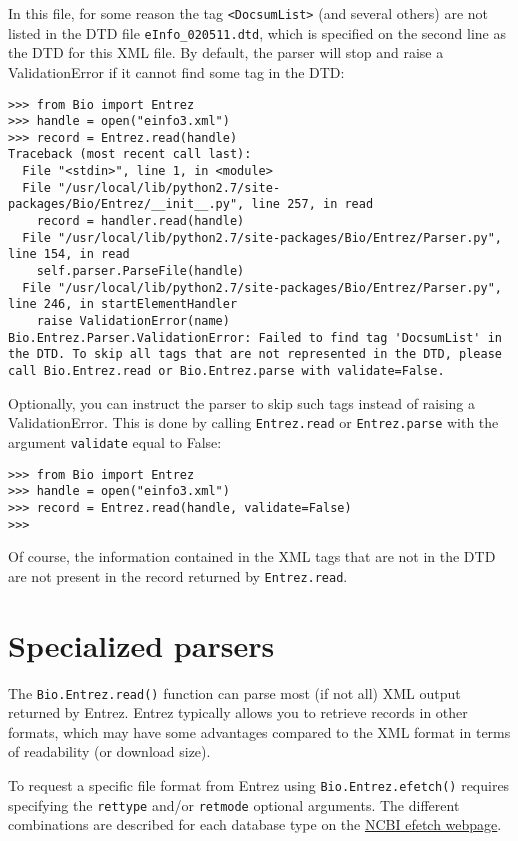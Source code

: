 \documentclass{report}
\begin{document}
In this file, for some reason the tag \verb|<DocsumList>| (and several others) are not listed in the DTD file \verb|eInfo_020511.dtd|, which is specified on the second line as the DTD for this XML file. By default, the parser will stop and raise a ValidationError if it cannot find some tag in the DTD:

\begin{verbatim}
>>> from Bio import Entrez
>>> handle = open("einfo3.xml")
>>> record = Entrez.read(handle)
Traceback (most recent call last):
  File "<stdin>", line 1, in <module>
  File "/usr/local/lib/python2.7/site-packages/Bio/Entrez/__init__.py", line 257, in read
    record = handler.read(handle)
  File "/usr/local/lib/python2.7/site-packages/Bio/Entrez/Parser.py", line 154, in read
    self.parser.ParseFile(handle)
  File "/usr/local/lib/python2.7/site-packages/Bio/Entrez/Parser.py", line 246, in startElementHandler
    raise ValidationError(name)
Bio.Entrez.Parser.ValidationError: Failed to find tag 'DocsumList' in the DTD. To skip all tags that are not represented in the DTD, please call Bio.Entrez.read or Bio.Entrez.parse with validate=False.
\end{verbatim}
Optionally, you can instruct the parser to skip such tags instead of raising a ValidationError. This is done by calling \verb|Entrez.read| or \verb|Entrez.parse| with the argument \verb|validate| equal to False:
\begin{verbatim}
>>> from Bio import Entrez
>>> handle = open("einfo3.xml")
>>> record = Entrez.read(handle, validate=False)
>>>
\end{verbatim}
Of course, the information contained in the XML tags that are not in the DTD are not present in the record returned by \verb|Entrez.read|.


\section{Specialized parsers}
\label{sec:entrez-specialized-parsers}

The \verb|Bio.Entrez.read()| function can parse most (if not all) XML output returned by Entrez. Entrez typically allows you to retrieve records in other formats, which may have some advantages compared to the XML format in terms of readability (or download size).

To request a specific file format from Entrez using \verb|Bio.Entrez.efetch()| requires specifying the \verb|rettype| and/or \verb|retmode| optional arguments.  The different combinations are described for each database type on the \href{http://www.ncbi.nlm.nih.gov/entrez/query/static/efetch_help.html}{NCBI efetch webpage}.
\end{document}
